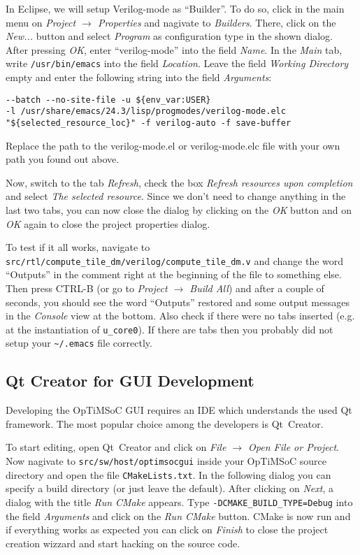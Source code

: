 In Eclipse, we will setup Verilog-mode as ``Builder''. To do so, click in the
main menu on \emph{Project $\rightarrow$ Properties} and nagivate to
\emph{Builders}. There, click on the \emph{New...} button and select
\emph{Program} as configuration type in the shown dialog. After pressing
\emph{OK}, enter ``verilog-mode'' into the field \emph{Name}. In the \emph{Main}
tab, write \verb|/usr/bin/emacs| into the field \emph{Location}. Leave the field
\emph{Working Directory} empty and enter the following string into the field
\emph{Arguments}:
\begin{lstlisting}
--batch --no-site-file -u ${env_var:USER}
-l /usr/share/emacs/24.3/lisp/progmodes/verilog-mode.elc
"${selected_resource_loc}" -f verilog-auto -f save-buffer
\end{lstlisting}

Replace the path to the verilog-mode.el or verilog-mode.elc file with your own
path you found out above.

Now, switch to the tab \emph{Refresh}, check the box \emph{Refresh resources
upon completion} and select \emph{The selected resource}. Since we don't need
to change anything in the last two tabs, you can now close the dialog by
clicking on the \emph{OK} button and on \emph{OK} again to close the project
properties dialog.

To test if it all works, navigate to
\verb|src/rtl/compute_tile_dm/verilog/compute_tile_dm.v| and change the word
``Outputs'' in the comment right at the beginning of the file to something
else. Then press CTRL-B (or go to \emph{Project $\rightarrow$ Build All}) and
after a couple of seconds, you should see the word ``Outputs'' restored and
some output messages in the \emph{Console} view at the bottom. Also check if
there were no tabs inserted (e.g. at the instantiation of \verb|u_core0|). If
there are tabs then you probably did not setup your \verb|~/.emacs| file
correctly.

\subsection{Qt Creator for GUI Development}

Developing the OpTiMSoC GUI requires an IDE which understands the used Qt
framework. The most popular choice among the developers is Qt~Creator.

To start editing, open Qt~Creator and click on \emph{File $\rightarrow$ Open
File or Project}. Now nagivate to \verb|src/sw/host/optimsocgui| inside your
OpTiMSoC source directory and open the file \verb|CMakeLists.txt|. In the
following dialog you can specify a build directory (or just leave the default).
After clicking on \emph{Next}, a dialog with the title \emph{Run CMake}
appears. Type \verb|-DCMAKE_BUILD_TYPE=Debug| into the field
\emph{Arguments} and click on the \emph{Run CMake} button. CMake is now run and
if everything works as expected you can click on \emph{Finish} to close the
project creation wizzard and start hacking on the source code.
